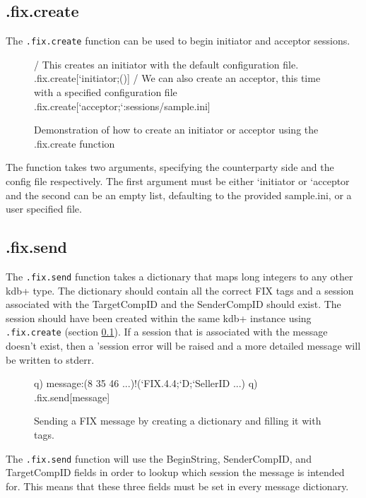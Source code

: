 \subsection{.fix.create}
\label{func:create}

The \texttt{.fix.create} function can be used to begin initiator and acceptor sessions. 

\begin{figure}[H]
\begin{qcode}
/ This creates an initiator with the default configuration file.
.fix.create[`initiator;()]
/ We can also create an acceptor, this time with a specified configuration file 
.fix.create[`acceptor;`:sessions/sample.ini]
\end{qcode}
\caption{Demonstration of how to create an initiator or acceptor using the .fix.create function}
\end{figure}

The function takes two arguments, specifying the counterparty side and the config file respectively. The first argument must be either `initiator or `acceptor and the second can be an empty list, defaulting to the provided sample.ini, or a user specified file.

\subsection{.fix.send}
\label{func:send}

The \texttt{.fix.send} function takes a dictionary that maps long integers to any other kdb+ type. The dictionary should contain all the correct FIX tags and a session associated with the TargetCompID and the SenderCompID should exist. The session should have been created within the same kdb+ instance using \texttt{.fix.create} (section \ref{func:create}). If a session that is associated with the message doesn't exist, then a 'session error will be raised and a more detailed message will be written to stderr.

\begin{figure}[H]
\begin{qcode}
q) message:(8 35 46 ...)!(`FIX.4.4;`D;`SellerID ...)
q) .fix.send[message]
\end{qcode}
\caption{Sending a FIX message by creating a dictionary and filling it with tags.}
\end{figure}

The \texttt{.fix.send} function will use the BeginString, SenderCompID, and TargetCompID fields in order to lookup which session the message is intended for.
This means that these three fields must be set in every message dictionary. 

